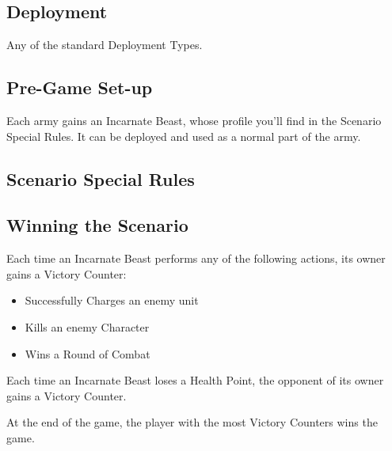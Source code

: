 
\label{DivineIntervention}


\subsection*{Deployment}

Any of the standard Deployment Types.

\subsection*{Pre-Game Set-up}

Each army gains an Incarnate Beast, whose profile you'll find in the Scenario Special Rules. It can be deployed and used as a normal part of the army.

\subsection*{Scenario Special Rules}

\newcommand{\incarnatebeast}{Incarnate Beast}



\subsection*{Winning the Scenario}

Each time an Incarnate Beast performs any of the following actions, its owner gains a Victory Counter:

\begin{itemize}
\item Successfully Charges an enemy unit
\item Kills an enemy Character
\item Wins a Round of Combat
\end{itemize}

Each time an Incarnate Beast loses a Health Point, the opponent of its owner gains a Victory Counter.

At the end of the game, the player with the most Victory Counters wins the game.


